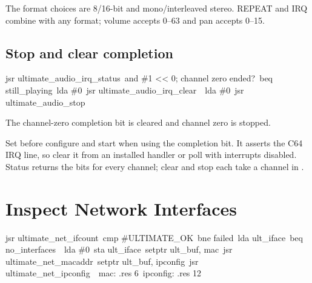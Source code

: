 \begin{resultbox}
The format choices are 8/16-bit and mono/interleaved stereo. REPEAT and IRQ
combine with any format; volume accepts 0--63 and pan accepts 0--15.
\end{resultbox}

\subsection*{Stop and clear completion}

\begin{listingbox}
\hspace*{2em}jsr ultimate\_audio\_irq\_status\
\hspace*{2em}and \#1 << 0\hspace{2em}; channel zero ended?\
\hspace*{2em}beq still\_playing\
\hspace*{2em}lda \#0\
\hspace*{2em}jsr ultimate\_audio\_irq\_clear\
\
\hspace*{2em}lda \#0\
\hspace*{2em}jsr ultimate\_audio\_stop
\end{listingbox}

\begin{resultbox}
The channel-zero completion bit is cleared and channel zero is stopped.
\end{resultbox}

Set \cmd{UA\_CTRL\_IRQ} before configure and start when using the completion
bit. It asserts the C64 IRQ line, so clear it from an installed handler or poll
with interrupts disabled. Status returns the bits for every channel; clear and
stop each take a channel in .


\Needspace{32\baselineskip}
\section{Inspect Network Interfaces}

\begin{listingbox}
\hspace*{2em}jsr ultimate\_net\_ifcount\
\hspace*{2em}cmp \#ULTIMATE\_OK\
\hspace*{2em}bne failed\
\hspace*{2em}lda ult\_iface\
\hspace*{2em}beq no\_interfaces\
\
\hspace*{2em}lda \#0\
\hspace*{2em}sta ult\_iface\
\hspace*{2em}setptr ult\_buf, mac\
\hspace*{2em}jsr ultimate\_net\_macaddr\
\hspace*{2em}setptr ult\_buf, ipconfig\
\hspace*{2em}jsr ultimate\_net\_ipconfig\
\
mac:      .res 6\
ipconfig: .res 12
\end{listingbox}

